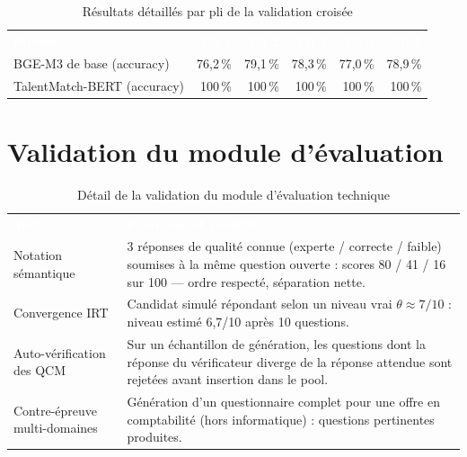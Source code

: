 \documentclass[12pt,a4paper]{report}
\begin{document}
\begin{table}[H]
\centering
\caption{Résultats détaillés par pli de la validation croisée}
\label{tab:annexe-cv5}
\small
\begin{tabularx}{\textwidth}{X r r r r r}
\rowcolor{tabheader}
\textcolor{white}{\textbf{Modèle}} & \textcolor{white}{\textbf{Pli 1}} & \textcolor{white}{\textbf{Pli 2}} & \textcolor{white}{\textbf{Pli 3}} & \textcolor{white}{\textbf{Pli 4}} & \textcolor{white}{\textbf{Pli 5}} \\
BGE-M3 de base (accuracy) & 76,2\,\% & 79,1\,\% & 78,3\,\% & 77,0\,\% & 78,9\,\% \\
\rowcolor{tabalt}
TalentMatch-BERT (accuracy) & 100\,\% & 100\,\% & 100\,\% & 100\,\% & 100\,\% \\
\bottomrule
\end{tabularx}
\end{table}

\section{Validation du module d'évaluation}

\begin{table}[H]
\centering
\caption{Détail de la validation du module d'évaluation technique}
\label{tab:annexe-eval}
\small
\begin{tabularx}{\textwidth}{p{5cm} X}
\rowcolor{tabheader}
\textcolor{white}{\textbf{Test}} & \textcolor{white}{\textbf{Protocole et résultat}} \\
Notation sémantique & 3 réponses de qualité connue (experte / correcte / faible) soumises à la même question ouverte : scores 80 / 41 / 16 sur 100 --- ordre respecté, séparation nette. \\
\rowcolor{tabalt}
Convergence IRT & Candidat simulé répondant selon un niveau vrai $\theta \approx 7/10$ : niveau estimé 6,7/10 après 10 questions. \\
Auto-vérification des QCM & Sur un échantillon de génération, les questions dont la réponse du vérificateur diverge de la réponse attendue sont rejetées avant insertion dans le pool. \\
\rowcolor{tabalt}
Contre-épreuve multi-domaines & Génération d'un questionnaire complet pour une offre en comptabilité (hors informatique) : questions pertinentes produites. \\
\bottomrule
\end{tabularx}
\end{table}
\end{document}
